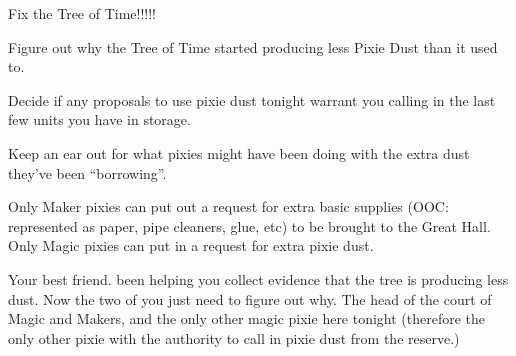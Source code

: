 \documentclass[char]{PP}
\begin{document}
\begin{itemz}
	\item Fix the Tree of Time!!!!!
	\item Figure out why the Tree of Time started producing less Pixie Dust than it used to.
	\item Decide if any proposals to use pixie dust tonight warrant you calling in the last few units you have in storage.
	\item Keep an ear out for what pixies might have been doing with the extra dust they’ve been “borrowing”.
\end{itemz}

\begin{itemz}[Notes]
	\item Only Maker pixies can put out a request for extra basic supplies (OOC: represented as paper, pipe cleaners, glue, etc) to be brought to the Great Hall. Only Magic pixies can put in a request for extra pixie dust.
\end{itemz}

\begin{contacts}
	\contact{\cSHelp{}} Your best friend. \cSHelp{\They} \cSHelp{\have} been helping you collect evidence that the tree is producing less dust. Now the two of you just need to figure out why.
	\contact{\cMHead{}} The head of the court of Magic and Makers, and the only other magic pixie here tonight (therefore the only other pixie with the authority to call in pixie dust from the reserve.)
\end{contacts}
\end{document}
